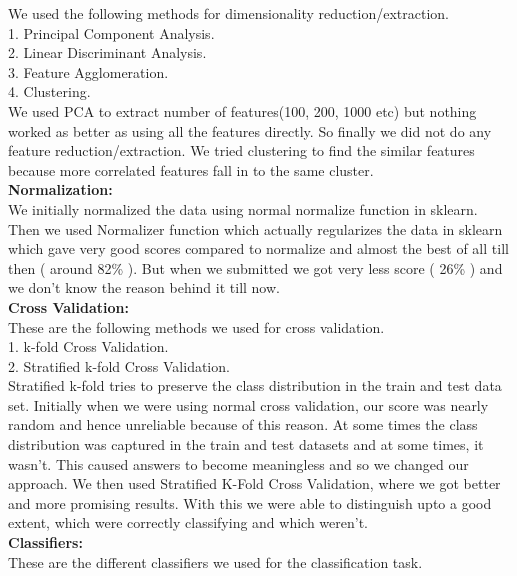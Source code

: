 \documentclass{article}
\begin{document}
We used the following methods for dimensionality reduction/extraction.\\
1. Principal Component Analysis.\\
2. Linear Discriminant Analysis.\\
3. Feature Agglomeration.\\
4. Clustering.\\

We used PCA to extract number of features(100, 200, 1000 etc) but nothing worked as better as using all the features directly. So finally we did not do any feature reduction/extraction. We tried clustering to find the similar features because more correlated features fall in to the same cluster.\\

{\bf Normalization:}\\

We initially normalized the data using normal normalize function in sklearn. Then we used Normalizer function which actually regularizes the data in sklearn which gave very good scores compared to normalize and almost the best of all till then ( around 82\% ). But when we submitted we got very less score ( 26\% ) and we don't know the reason behind it till now.\\

{\bf Cross Validation:}\\
These are the following methods we used for cross validation.\\

1. k-fold Cross Validation.\\
2. Stratified k-fold Cross Validation.\\

Stratified k-fold tries to preserve the class distribution in the train and test data set. Initially when we were using normal cross validation, our  score was nearly random and hence unreliable because of this reason. At some times the class distribution was captured in the train and test datasets and at some times, it wasn't. This caused answers to become meaningless and so we changed our approach. We then used Stratified K-Fold Cross Validation, where we got better and more promising results. With this we were able to distinguish upto a good extent,  which were correctly classifying and which weren't.\\

{\bf Classifiers:}\\
These are the different classifiers we used for the classification task.\\
\end{document}
